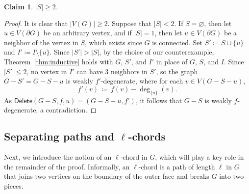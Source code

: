 \documentclass[11pt]{article}
\theoremstyle{slantthm}
\newtheorem{claim}{Claim}%
\numberwithin{equation}{section}
\theoremstyle{definition}
\renewcommand{\leq}{\leqslant}
\renewcommand{\geq}{\geqslant}
\newcommand{\defeq}{\coloneqq}
\numberwithin{equation}{section}
\newcommand{\0}{\varnothing}
\newcommand{\set}[1]{\{#1\}}
\newcommand{\del}{\mathsf{Delete}}
\newcommand{\bdry}[1]{{\partial #1}}
\begin{document}
\begin{claim}\label{claim:S2}
    $|S| \geq 2$.
\end{claim}
\begin{proof}
    It is clear that $|V(G)| \geq 2$. Suppose that $|S| < 2$. If $S = \0$, then let $u \in V(\bdry{G})$ be an arbitrary vertex, and if $|S| = 1$, then let $u \in V(\bdry{G})$ be a neighbor of the vertex in $S$, which exists since $G$ is connected. Set $S' \defeq S \cup \set{u}$ and $I' \defeq I \setminus \set{u}$. Since $|S'| > |S|$, by the choice of our counterexample, Theorem~\ref{thm:inductive} holds with $G$, $S'$, and $I'$ in place of $G$, $S$, and $I$. Since $|S'| \leq 2$, no vertex in $I'$ can have $3$ neighbors in $S'$, so the graph $G - S' = G - S - u$ is weakly $f'$-degenerate, where for each $v \in V(G - S - u)$,
    \[
        f'(v) \,\defeq\, f(v) - \deg_{\set{u}} (v).
    \]
    As $\del(G - S,f,u) = (G - S - u, f')$, it follows that $G - S$ is weakly $f$-degenerate, a contradiction.
\end{proof}

    \subsection{Separating paths and $\ell$-chords}

Next, we introduce the notion of an {$\ell$-chord} in $G$, which will play a key role in the remainder of the proof. Informally, an $\ell$-chord is a path of length $\ell$ in $G$ that joins two vertices on the boundary of the outer face and breaks $G$ into two pieces.
\end{document}

